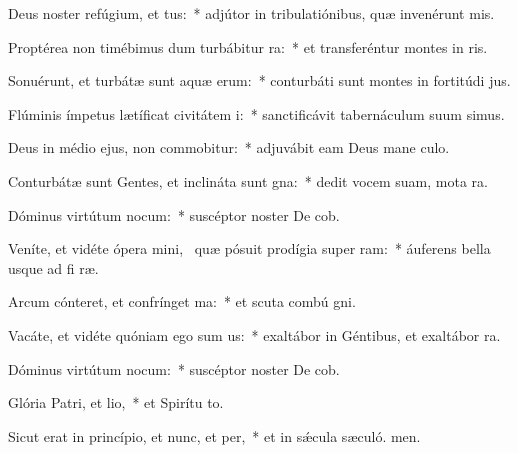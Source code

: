 \item Deus noster refúgium, et tus:~* adjútor in tribulatiónibus, quæ invenérunt  mis.
\item Proptérea non timébimus dum turbábitur ra:~* et transferéntur montes in  ris.
\item Sonuérunt, et turbátæ sunt aquæ erum:~* conturbáti sunt montes in fortitúdi jus.
\item Flúminis ímpetus lætíficat civitátem i:~* sanctificávit tabernáculum suum simus.
\item Deus in médio ejus, non commobitur:~* adjuvábit eam Deus mane culo.
\item Conturbátæ sunt Gentes, et inclináta sunt gna:~* dedit vocem suam, mota  ra.
\item Dóminus virtútum nocum:~* suscéptor noster De cob.
\item Veníte, et vidéte ópera mini,~\pscross{} quæ pósuit prodígia super ram:~* áuferens bella usque ad fi ræ.
\item Arcum cónteret, et confrínget ma:~* et scuta combú gni.
\item Vacáte, et vidéte quóniam ego sum us:~* exaltábor in Géntibus, et exaltábor  ra.
\item Dóminus virtútum nocum:~* suscéptor noster De cob.
\item Glória Patri, et lio,~* et Spirítu to.
\item Sicut erat in princípio, et nunc, et per,~* et in sǽcula sæculó. men.
